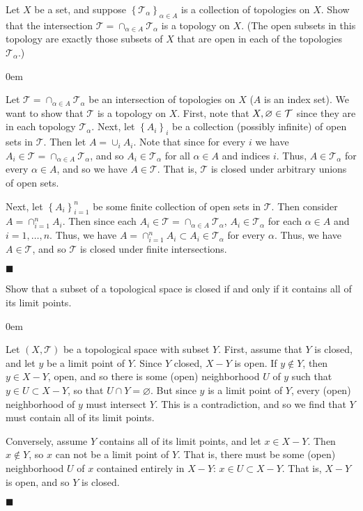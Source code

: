 \documentclass[12pt]{article}
\renewcommand{\qed}{\hfill$\blacksquare$}
\renewenvironment{proof}{\begin{addmargin}[1em]{0em}\begin{newproof}}{\end{newproof}\end{addmargin}\qed}
\newenvironment{exercise}[2][Exercise]{\begin{trivlist}
\item[\hskip \labelsep {\bfseries #1}\hskip \labelsep {\bfseries #2.}]}{\end{trivlist}}
\begin{document}
\begin{exercise}{2.6}
Let $X$ be a set, and suppose $\left\{ \mathcal{T}_{\alpha}\right\}_{\alpha \in A}$ is a collection of topologies on $X$. Show that the intersection $\mathcal{T} = \cap_{\alpha \in A} \mathcal{T}_{\alpha}$ is a topology on $X$. (The open subsets in this topology are exactly those subsets of $X$ that are open in each of the topologies $\mathcal{T}_{\alpha}$.)
\end{exercise}
\begin{proof}
Let $\mathcal{T}=\cap_{\alpha \in A} \mathcal{T}_{\alpha}$ be an intersection of topologies on $X$ ($A$ is an index set).  We want to show that $\mathcal{T}$ is a topology on $X$. First, note that $X,\varnothing\empty \in \mathcal{T}$ since they are in each topology $\mathcal{T}_{\alpha}$. Next, let $\left\{A_i\right\}_i$ be a collection (possibly infinite) of open sets in $\mathcal{T}$. Then let $A = \cup_{i} A_i$. Note that since for every $i$ we have $A_i \in\mathcal{T}=\cap_{\alpha \in A} \mathcal{T}_{\alpha}$, and so $A_i \in \mathcal{T}_{\alpha} $ for all $\alpha \in A$ and indices $i$. Thus, $A \in \mathcal{T}_{\alpha}$ for every $\alpha \in A$, and so we have $A \in \mathcal{T}$. That is, $\mathcal{T}$ is closed under arbitrary unions of open sets.

Next, let $\left\{A_i\right\}_{i=1}^n$ be some finite collection of open sets in $\mathcal{T}$. Then consider $A = \cap_{i=1}^n A_i$. Then since each $A_i \in \mathcal{T}=\cap_{\alpha \in A} \mathcal{T}_{\alpha}$, $A_i\in \mathcal{T}_{\alpha}$ for each $\alpha \in A$ and $i=1,\ldots,n$. Thus, we have $A = \cap_{i=1}^n A_i \subset A_i \in \mathcal{T}_{\alpha}$ for every $\alpha$. Thus, we have $A\in \mathcal{T}$, and so $\mathcal{T}$ is closed under finite intersections.
\end{proof}






\begin{exercise}{2.10}
Show that a subset of a topological space is closed if and only if it contains all of its limit points.
\end{exercise}
\begin{proof}
Let $\left(X,\mathcal{T}\right)$ be a topological space with subset $Y$. First, assume that $Y$ is closed, and let $y$ be a limit point of $Y$. Since $Y$ closed, $X-Y$ is open. If $y \notin Y$, then $y\in X-Y$, open, and so there is some (open) neighborhood $U$ of $y$ such that $y\in U \subset X-Y$, so that $U\cap Y = \varnothing$. But since $y$ is a limit point of $Y$, every (open) neighborhood of $y$ must intersect $Y$. This is a contradiction, and so we find that $Y$ must contain all of its limit points.

Conversely, assume $Y$ contains all of its limit points, and let $x \in X-Y$. Then $x \notin Y$, so $x$ can not be a limit point of $Y$. That is, there must be some (open) neighborhood $U$ of $x$ contained entirely in $X-Y$: $x\in U \subset X-Y$. That is, $X-Y$ is open, and so $Y$ is closed.
\end{proof}
\end{document}
